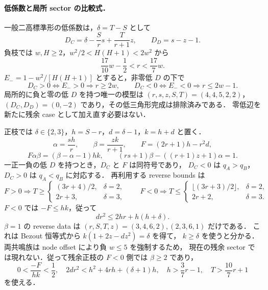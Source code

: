 \paragraph{低係数と局所 sector の比較式．}
一般二高標準形の低係数は，$\delta=T-S$ として
\[
 D_C=\delta-\frac Sr s+\frac T{r+1}z,\qquad D_D=s-z-1.
\]
負枝では $w,H\ge2$，$w^2/2<H(H+1)<2w^2$ から
\[
 \frac{17}{10}w-\frac12<r<\frac{17}{7}w.
\]
$E_-=1-w^2/[H(H+1)]$ とすると，非零低 $D$ の下で
\[
 D_C>0\Longleftrightarrow E_->0\Longrightarrow r\ge2w,
 \qquad
 D_C<0\Longleftrightarrow E_-<0\Longrightarrow r\le2w-1.
\]
局所的に負と零の低 $D$ を持つ唯一の模型は
$(r,s,z,S,T)=(4,4,5,2,2)$，$(D_C,D_D)=(0,-2)$ であり，その低三角形完成は排除済みである．
零低辺を新たに残余 case として加え直す必要はない．

正枝では $\delta\in\{2,3\}$，$h=S-r$，$d=\delta-1$，$k=h+d$ と置く．
\[
 \alpha=\frac{sh}{r},\qquad\beta=\frac{zk}{r+1},\qquad
 F=(2r+1)h-r^2d,
\]
\[
 F\alpha\beta=(\beta-\alpha-1)hk,
 \qquad (rs+1)\beta-((r+1)z+1)\alpha=1.
\]
一正一負の低 $D$ を持つとき，$D_C$ と $F$ は同符号であり，
$D_C<0$ は $q_A>q_B$，$D_C>0$ は $q_A<q_B$ に対応する．
再利用する reverse bounds は
\[
 F>0\Longrightarrow
 T\ge\begin{cases}(3r+4)/2,&\delta=2,\\2r+3,&\delta=3,\end{cases}
 \qquad
 F<0\Longrightarrow
 T\le\begin{cases}\lfloor(3r+3)/2\rfloor,&\delta=2,\\2r+2,&\delta=3.\end{cases}
\]
$F<0$ では $-F\le hk$，従って
\[
 d r^2\le2hr+h(h+\delta).
\]
$\beta=1$ の reverse data は $(r,S,T,z)=(3,4,6,2),(2,3,6,1)$ だけである．
これは Bezout 恒等式から $k(1+2z-dz^2)=\delta$ を得て，
$k\ge\delta$ を使うと分かる．両共鳴族は node offset により負 $w\le5$ を強制するため，
現在の残余 sector では現れない．従って残余正枝の $F<0$ 側では $\beta\ge2$ であり，
\[
 0<\frac{-F}{hk}<\frac12,
 \quad 2d r^2<h^2+4rh+(\delta+1)h,
 \quad h>\frac37r-1,
 \quad T>\frac{10}{7}r+1
\]
を使える．

